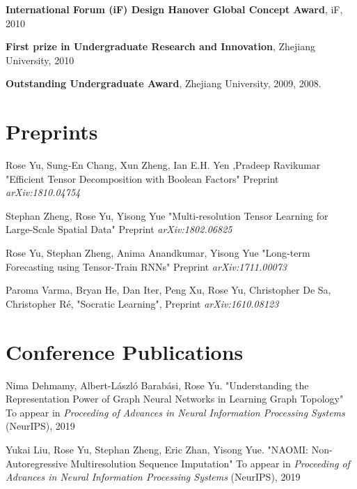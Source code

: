 \documentclass[margin,line]{res}
\begin{document}
\begin{resume}
\textbf{International Forum (iF) Design Hanover Global Concept Award}, iF, 2010 

\textbf{First prize in Undergraduate Research and Innovation}, Zhejiang University, 2010   

\textbf{Outstanding Undergraduate Award}, Zhejiang University, 2009, 2008. 




\section{\sc Preprints}
\begin{enumerate}[label={[P\arabic*]}]

\item Rose Yu, Sung-En Chang, Xun Zheng, Ian E.H. Yen ,Pradeep Ravikumar
      "Efficient Tensor Decomposition with Boolean Factors"
      Preprint \textit{arXiv:1810.04754}
	
\item  Stephan Zheng, Rose Yu, Yisong Yue
	"Multi-resolution Tensor Learning for Large-Scale Spatial Data"
	Preprint \textit{arXiv:1802.06825}
	
\item Rose Yu, Stephan Zheng, Anima Anandkumar, Yisong Yue
"Long-term Forecasting using Tensor-Train RNNs"
Preprint \textit{arXiv:1711.00073}


\item Paroma Varma, Bryan He, Dan Iter, Peng Xu,  Rose Yu, Christopher De Sa,  Christopher R\'e,  "Socratic Learning",
Preprint \textit{arXiv:1610.08123}
\end{enumerate}
\section{\sc Conference Publications}

\begin{enumerate}[label={[C\arabic*]}]
\item Nima Dehmamy, Albert-László Barabási, Rose Yu.  "Understanding the Representation Power of Graph Neural Networks in Learning Graph Topology" To appear in \textit{Proceeding of Advances in Neural Information Processing Systems} (NeurIPS), 2019
 
 
\item  Yukai Liu, Rose Yu, Stephan Zheng, Eric Zhan, Yisong Yue. "NAOMI: Non-Autoregressive Multiresolution Sequence Imputation" To appear in \textit{Proceeding of Advances in Neural Information Processing Systems} (NeurIPS), 2019



\end{enumerate}
\end{resume}
\end{document}
